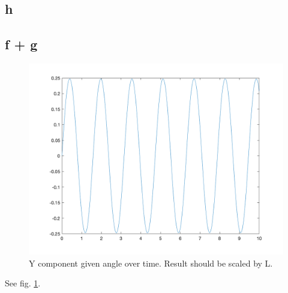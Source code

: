 \subsection{h}
\subsection{f + g}
\begin{figure}[htbp]
   \centering
   \includegraphics[width=\textwidth]{figs/pend_y.png}%
   \caption{Y component given angle over time. Result should be scaled by L. }
   \label{fig:pend_y}
\end{figure}

See fig. \ref{fig:pend_y}.